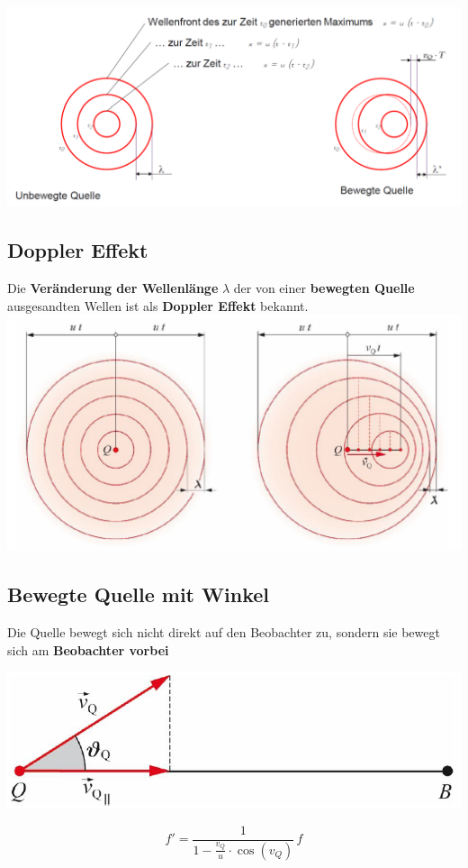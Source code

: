 \includegraphics[width=0.98\linewidth]{Bilder/Wellen-Optik/Unbewegte_Quelle}





\subsection{Doppler Effekt}
Die \textbf{Veränderung der Wellenlänge} $\lambda$ der von einer \textbf{bewegten Quelle} ausgesandten Wellen ist als \textbf{Doppler Effekt} bekannt.  \\

\includegraphics[width=0.8\linewidth]{Bilder/Wellen-Optik/Doppler_effekt}



\subsection{Bewegte Quelle mit Winkel}
Die Quelle bewegt sich nicht direkt auf den Beobachter zu, sondern sie bewegt sich am \textbf{Beobachter vorbei} \\


\begin{minipage}{0.48\linewidth}
\includegraphics[width=0.98\linewidth]{Bilder/Wellen-Optik/bewegte_quelle_winkel} \\
\end{minipage}
\hfill
\begin{minipage}{0.48\linewidth}
$$ \boxed{ f' =  \frac{1}{1 - \frac{v_Q}{u} \cdot \cos(v_Q)}  \, f} $$
\end{minipage}



